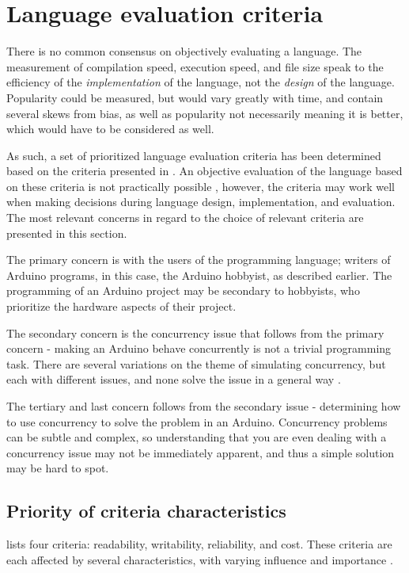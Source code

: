\section{Language evaluation criteria}\label{sec:languageeval}

There is no common consensus on objectively evaluating a language. The measurement of compilation speed, execution speed, and file size speak to the efficiency of the \textit{implementation} of the language, not the \textit{design} of the language. Popularity could be measured, but would vary greatly with time, and contain several skews from bias,  as well as popularity not necessarily meaning it is better, which would have to be considered as well.

As such, a set of prioritized language evaluation criteria has been determined based on the criteria presented in \cite{Sebesta2016}. An objective evaluation of the language based on these criteria is not practically possible \cite{Sebesta2016}, however, the criteria may work well when making decisions during language design, implementation, and evaluation. The most relevant concerns in regard to the choice of relevant criteria are presented in this section.

The primary concern is with the users of the programming language; writers of Arduino programs, in this case, the Arduino hobbyist, as described earlier. The programming of an Arduino project may be secondary to hobbyists, who prioritize the hardware aspects of their project.

The secondary concern is the concurrency issue that follows from the primary concern - making an Arduino behave concurrently is not a trivial programming task. There are several variations on the theme of simulating concurrency, but each with different issues, and none solve the issue in a general way \cite{Restucia2022}.

The tertiary and last concern follows from the secondary issue - determining how to use concurrency to solve the problem in an Arduino. Concurrency problems can be subtle and complex, so understanding that you are even dealing with a concurrency issue may not be immediately apparent, and thus a simple solution may be hard to spot.

\subsection{Priority of criteria characteristics}
 lists four criteria: readability, writability, reliability, and cost. These criteria are each affected by several characteristics, with varying influence and importance \cite{Sebesta2016}.

